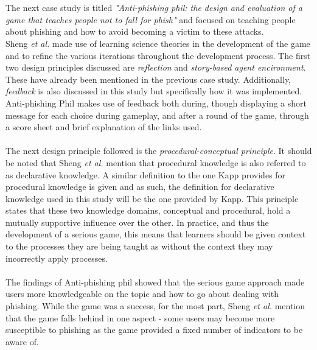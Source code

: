 \documentclass[conference]{IEEEtran}
\begin{document}
\\\\
The next case study is titled \textit{"Anti-phishing phil: the design and evaluation of a game that teaches people not to fall for phish"} and focused on teaching people about phishing and how to avoid becoming a victim to these attacks\cite{Sheng2007}. 
\\
Sheng \textit{et al.}\cite{Sheng2007} made use of learning science theories in the development of the game and to refine the various iterations throughout the development process. The first two design principles discussed are \textit{reflection} and \textit{story-based agent encironment}\cite{Sheng2007}. These have already been mentioned in the previous case study. Additionally, \textit{feedback} is also discussed in this study but specifically how it was implemented. Anti-phishing Phil makes use of feedback both during, though displaying a short message for each choice during gameplay, and after a round of the game, through a score sheet and brief explanation of the links used\cite{Sheng2007}. 
\\\\
The next design principle followed is the \textit{procedural-conceptual principle}\cite{Sheng2007}. It should be noted that Sheng \textit{et al.}\cite{Sheng2007} mention that procedural knowledge is also referred to as declarative knowledge. A similar definition to the one Kapp\cite{Kapp2012a} provides for procedural knowledge is given and as such, the definition for declarative knowledge used in this study will be the one provided by Kapp\cite{Kapp2012a}. This principle states that these two knowledge domains, conceptual and procedural, hold a mutually supportive influence over the other\cite{Sheng2007}. In practice, and thus the development of a serious game, this means that learners should be given context to the processes they are being taught as without the context they may incorrectly apply processes\cite{Sheng2007}.
\\\\
The findings of Anti-phishing phil showed that the serious game approach made users more knowledgeable on the topic and how to go about dealing with phishing\cite{Sheng2007}. While the game was a success, for the most part, Sheng \textit{et al.}\cite{Sheng2007} mention that the game falls behind in one aspect - some users may become more susceptible to phishing as the game provided a fixed number of indicators to be aware of.
\\\\
\end{document}

